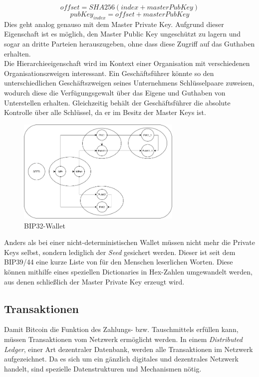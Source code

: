 $$offset = SHA256(index + masterPubKey)$$
$$pubKey_{index} = offset + masterPubKey$$ Dies geht analog genauso mit dem Master Private Key. 
Aufgrund dieser Eigenschaft ist es möglich, den Master Public Key ungeschützt zu lagern und sogar an dritte Parteien herauszugeben, ohne dass diese Zugriff auf das Guthaben erhalten.\\
Die Hierarchieeigenschaft wird im Kontext einer Organisation mit verschiedenen Organisationszweigen interessant. Ein Geschäftsführer könnte so den unterschiedlichen Geschäftszweigen seines Unternehmens Schlüsselpaare zuweisen, wodurch diese die Verfügungsgewalt über das Eigene und Guthaben von Unterstellen erhalten. Gleichzeitig behält der Geschäftsführer die absolute Kontrolle über alle Schlüssel, da er im Besitz der Master Keys ist. 
\begin{figure}[htpb]
	\centering
	\includegraphics[width=0.7\textwidth]{images/bip32_wallet.png}
	\caption{BIP32-Wallet}
	\label{6braun:fig:non-deterministic_wallet}
\end{figure}
Anders als bei einer nicht-deterministischen Wallet müssen nicht mehr die Private Keys selbst, sondern lediglich der \emph{Seed} gesichert werden. Dieser ist seit dem BIP39/44 eine kurze Liste von für den Menschen leserlichen Worten. Diese können mithilfe eines speziellen Dictionaries in Hex-Zahlen umgewandelt werden, aus denen schließlich der Master Private Key erzeugt wird.
\subsection{Transaktionen}
Damit Bitcoin die Funktion des Zahlungs- bzw. Tauschmittels erfüllen kann, müssen Transaktionen vom Netzwerk ermöglicht werden. In einem \emph{Distributed Ledger}, einer Art dezentraler Datenbank, werden alle Transaktionen im Netzwerk aufgezeichnet. Da es sich um ein gänzlich digitales und dezentrales Netzwerk handelt, sind spezielle Datenstrukturen und Mechanismen nötig.\\
